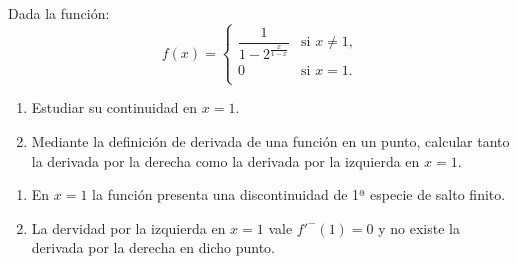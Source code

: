 {Dada la función:
\[
\renewcommand{\arraystretch}{2}
f(x)=
\begin{cases}
\dfrac{1}{1 - 2^\frac{x}{1-x}} & \mbox{si $x\ne 1$,} \\
0 & \mbox{si $x = 1$.} \\
\end{cases}
\]
\begin{enumerate}
\item Estudiar su continuidad en $x=1$.
\item Mediante la definición de derivada de una función en un punto, calcular tanto la derivada por la derecha como la derivada por la izquierda en $x=1$.
\end{enumerate}
}
{\begin{enumerate}
\item En $x=1$ la función presenta una discontinuidad de 1ª especie de salto finito.
\item La dervidad por la izquierda en $x=1$ vale $f'^-(1)=0$ y no existe la derivada por la derecha en dicho punto. 
\end{enumerate}
}
